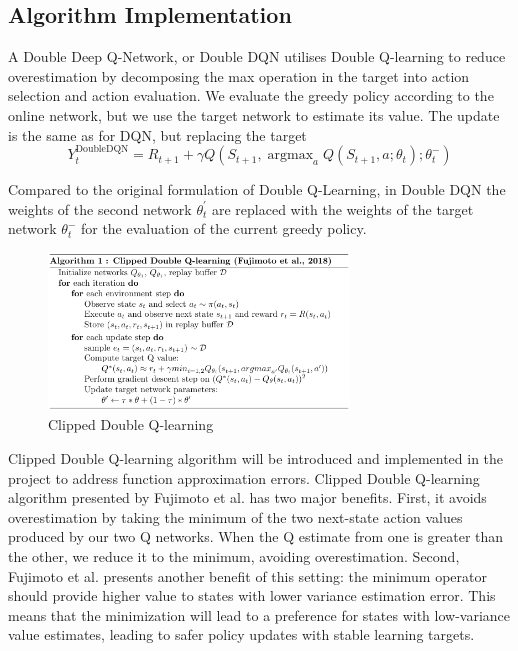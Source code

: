 \documentclass{article}
\DeclareMathOperator*{\argmax}{argmax}
\begin{document}
\subsection{Algorithm Implementation}



A Double Deep Q-Network, or Double DQN utilises Double Q-learning to reduce
overestimation by decomposing the max operation in the target into action
selection and action evaluation. We evaluate the greedy policy according to the
online network, but we use the target network to estimate its value. The update
is the same as for DQN, but replacing the target
\[
    Y_{t}^{\text{DoubleDQN}} = R_{t+1} + \gamma Q(S_{t+1}, \argmax_a Q(S_{t+1},
    a; \theta _{t});\theta _{t}^{-})
\]

Compared to the original formulation of Double Q-Learning, in Double DQN the
weights of the second network $\theta _{t}^{'}$ are replaced with the weights of
the target network $\theta_{t}^{-}$ for the evaluation of the current greedy
policy.

\begin{figure}[!htbp]
    \begin{center}
    \includegraphics[width=8cm]{alg1_ClippedDDQ_Fujimoto.png}
    \end{center}
    \caption{Clipped Double Q-learning}
    \label{fig:numcomments}
\end{figure}

Clipped Double Q-learning algorithm will be introduced and implemented in the
project to address function approximation errors. Clipped Double Q-learning
algorithm presented by Fujimoto et al. has two major benefits. First, it avoids
overestimation by taking the minimum of the two next-state action values
produced by our two Q networks. When the Q estimate from one is greater than the
other, we reduce it to the minimum, avoiding overestimation. Second, Fujimoto et
al. presents another benefit of this setting: the minimum operator should
provide higher value to states with lower variance estimation error.  This means
that the minimization will lead to a preference for states with low-variance
value estimates, leading to safer policy updates with stable learning targets.
\end{document}
